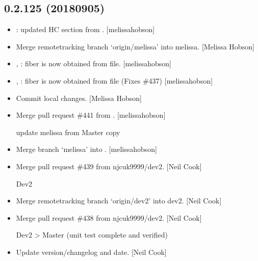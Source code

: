 \documentclass[a4paper,10pt,english]{report}
\begin{document}
\subsection{0.2.125 (2018\sphinxhyphen{}09\sphinxhyphen{}05)}
\label{\detokenize{misc/changelog:id355}}\begin{itemize}
\item {} 
: updated HC section from
. {[}melissa\sphinxhyphen{}hobson{]}

\item {} 
Merge remote\sphinxhyphen{}tracking branch ‘origin/melissa’ into melissa. {[}Melissa
Hobson{]}

\item {} 
, : fiber is now obtained from file.
{[}melissa\sphinxhyphen{}hobson{]}

\item {} 
, : fiber is now obtained from file
(Fixes \#437) {[}melissa\sphinxhyphen{}hobson{]}

\item {} 
Commit local changes. {[}Melissa Hobson{]}

\item {} 
Merge pull request \#441 from . {[}melissa\sphinxhyphen{}hobson{]}

update melissa from Master copy

\item {} 
Merge branch ‘melissa’ into . {[}melissa\sphinxhyphen{}hobson{]}

\item {} 
Merge pull request \#439 from njcuk9999/dev2. {[}Neil Cook{]}

Dev2

\item {} 
Merge remote\sphinxhyphen{}tracking branch ‘origin/dev2’ into dev2. {[}Neil Cook{]}

\item {} 
Merge pull request \#438 from njcuk9999/dev2. {[}Neil Cook{]}

Dev2 \textendash{}\textgreater{} Master (unit test complete and verified)

\item {} 
Update version/changelog and date. {[}Neil Cook{]}

\end{itemize}
\end{document}
